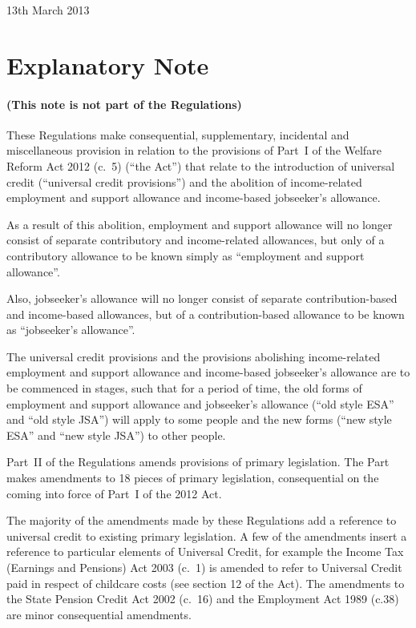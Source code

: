 \documentclass[12pt,a4paper]{article}
\begin{document}
13th March 2013

\small

\part{Explanatory Note}

\renewcommand\parthead{— Explanatory Note}

\subsection*{(This note is not part of the Regulations)}

These Regulations make consequential, supplementary, incidental and miscellaneous provision in relation to the provisions of Part~I of the Welfare Reform Act 2012 (c.~5) (“the Act”) that relate to the introduction of universal credit (“universal credit provisions”) and the abolition of income-related employment and support allowance and income-based jobseeker’s allowance.

As a result of this abolition, employment and support allowance will no longer consist of separate contributory and income-related allowances, but only of a contributory allowance to be known simply as “employment and support allowance”.

Also, jobseeker’s allowance will no longer consist of separate contribution-based and income-based allowances, but of a contribution-based allowance to be known as “jobseeker’s allowance”.

The universal credit provisions and the provisions abolishing income-related employment and support allowance and income-based jobseeker’s allowance are to be commenced in stages, such that for a period of time, the old forms of employment and support allowance and jobseeker’s allowance (“old style ESA” and “old style JSA”) will apply to some people and the new forms (“new style ESA” and “new style JSA”) to other people.

Part~II of the Regulations amends provisions of primary legislation. The Part makes amendments to 18 pieces of primary legislation, consequential on the coming into force of Part~I of the 2012 Act.

The majority of the amendments made by these Regulations add a reference to universal credit to existing primary legislation. A few of the amendments insert a reference to particular elements of Universal Credit, for example the Income Tax (Earnings and Pensions) Act 2003 (c.~1) is amended to refer to Universal Credit paid in respect of childcare costs (see section 12 of the Act). The amendments to the State Pension Credit Act 2002 (c.~16) and the Employment Act 1989 (c.38) are minor consequential amendments.
\end{document}
